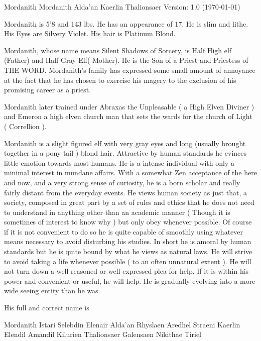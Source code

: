 




\def\cnotice{}
\def\manualname{Character Description}

\manpage Mordanith
Mordanith Alda'an Kaerlin Thalionsaer
Version: 1.0 (\today)


Mordanith is 5'8 and 143 lbs. He has an appearance of 17. He is
slim and lithe. His Eyes are Silvery Violet. His hair is Platinum Blond.

Mordanith, whose name means Silent Shadows of Sorcery, is Half High
elf (Father) and Half Gray Elf( Mother). He is the Son of a Priest
and Priestess of THE WORD. Mordanith's family has expressed some
small amount of annoyance at the fact that he has chosen to exercise
his magery to the exclusion of his promising career as a priest.

Mordanith later trained under Abraxas the Unpleasable ( a High Elven
Diviner ) and Emeron a high elven church man that sets the wards for
the church of Light ( Correllion ).

Mordanith is a slight figured elf with very gray eyes and long
(usually brought together in a pony tail ) blond hair. Attractive by
human standards he evinces little emotion towards most humans. He is
a intense individual with only a minimal interest in mundane affairs.
With a somewhat Zen acceptance of the here and now, and a very strong
sense of curiosity, he is a born scholar and really fairly distant
from the everyday events. He views human society as just that, a
society, composed in great part by a set of rules and ethics that he
does not need to understand in anything other than an academic manner
( Though it is sometimes of interest to know why ) but only obey
whenever possible. Of course if it is not convenient to do so he is
quite capable of smoothly using whatever means necessary to avoid
disturbing his studies. In short he is amoral by human standards but
he is quite bound by what he views as natural laws. He will strive to
avoid taking a life whenever possible ( to an often unnatural extent ).
He will not turn down a well reasoned or well expressed plea for help.
If it is within his power and convenient or useful, he will help.
He is gradually evolving into a more wide seeing entity than he was.

His full and correct name is

Mordanith Istari Selebdin Elenair
Alda'an Rhyslaen Aredhel Straeni
Kaerlin Elendil Amandil Kilurien
Thalionsaer Galensaen Nikithae Tiriel


\bye
